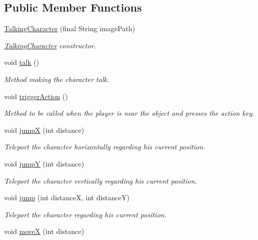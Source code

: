 \subsection*{Public Member Functions}
\begin{DoxyCompactItemize}
\item 
\hyperlink{a00029_afb0031b1a74ecc52e568ba319384853c}{Talking\-Character} (final String image\-Path)
\begin{DoxyCompactList}\small\item\em \hyperlink{a00029}{Talking\-Character} constructor. \end{DoxyCompactList}\item 
void \hyperlink{a00029_ac38a9c3d5a62edc8e8ae776410c834af}{talk} ()
\begin{DoxyCompactList}\small\item\em Method making the character talk. \end{DoxyCompactList}\item 
void \hyperlink{a00029_a880e0de97bfae094b3d25a12c055cad2}{trigger\-Action} ()
\begin{DoxyCompactList}\small\item\em Method to be called when the player is near the object and presses the action key. \end{DoxyCompactList}\item 
void \hyperlink{a00005_a1c4f59dee601acfb4cf3ec000a87e142}{jump\-X} (int distance)
\begin{DoxyCompactList}\small\item\em Teleport the character horizontally regarding his current position. \end{DoxyCompactList}\item 
void \hyperlink{a00005_aaddaea7c1175b19f80c0a10b87b59d75}{jump\-Y} (int distance)
\begin{DoxyCompactList}\small\item\em Teleport the character vertically regarding his current position. \end{DoxyCompactList}\item 
void \hyperlink{a00005_a38da898f19b8ac87049552edb20a70c8}{jump} (int distance\-X, int distance\-Y)
\begin{DoxyCompactList}\small\item\em Teleport the character regarding his current position. \end{DoxyCompactList}\item 
void \hyperlink{a00005_afd88136a2b4b1ece60657bb4481ab955}{move\-X} (int distance)

\end{DoxyCompactItemize}
